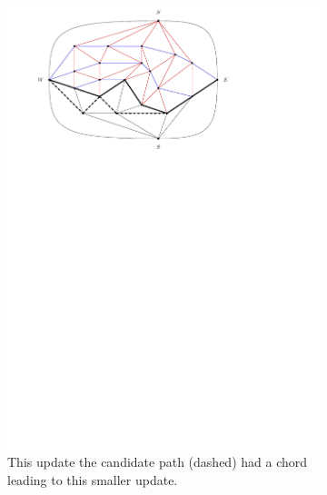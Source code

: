 \begin{figure}
    \centering
    \ContinuedFloat
    \begin{subfigure}[b]{.9 \textwidth}
      \includegraphics[width=\textwidth]{examples/img/smallExample/smallExample-5}
      \caption{This update the candidate path (dashed) had a chord leading to this smaller update.}
      \label{fig:ex:simple:5}
    \end{subfigure}
    ~
    \begin{subfigure}[b]{.9 \textwidth}

\end{subfigure}
\end{figure}
